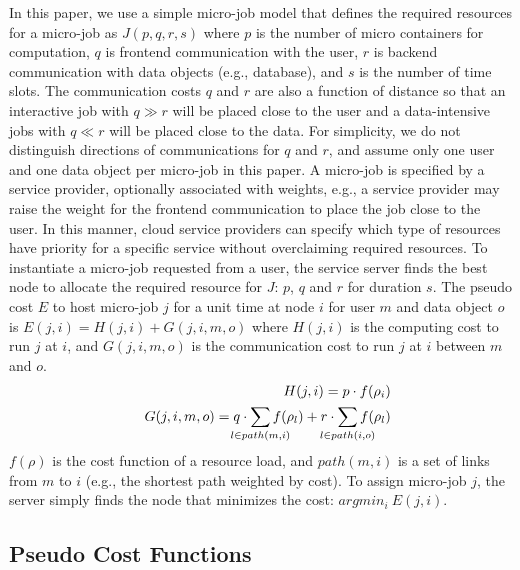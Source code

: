 In this paper, we use a simple micro-job model that defines the
required resources for a micro-job as $J(p, q, r, s)$ where
$p$ is the number of micro containers for computation,
$q$ is frontend communication with the user,
$r$ is backend communication with data objects (e.g., database), and
$s$ is the number of time slots.
The communication costs $q$ and $r$ are also a function of distance so
that an interactive job with $q \gg r$ will be placed close to the
user and a data-intensive jobs with $q \ll r$ will be placed close to
the data.
For simplicity, we do not distinguish directions of
communications for $q$ and $r$, and assume only one user and one data
object per micro-job in this paper.
A micro-job is specified by a service provider, optionally associated with
weights, e.g., a service provider may raise the weight for the
frontend communication to place the job close to the user.
In this manner, cloud service providers can specify which
type of resources have priority for a specific service without
overclaiming required resources.
To instantiate a micro-job requested from a user, the service
server finds the best node to allocate the required resource
for $J$: $p$, $q$ and $r$ for duration $s$.
The pseudo cost $E$ to host micro-job $j$ for a unit time at node $i$ for
user $m$ and data object $o$ is \(E(j, i)     = H(j,i) + G(j,i,m,o)\) where $H(j, i)$ is the computing cost to run $j$ at $i$, and
$G(j, i, m, o)$ is the communication cost to run $j$ at $i$
between $m$ and $o$.
\begin{eqnarray*}
  &&  H(j,i)      = p \cdot f(\rho_{i}) \\
  &&  G(j,i,m,o)  = q \cdot \smashoperator{\sum_{l \in path(m,i)}} f(\rho_{l}) + r \cdot \smashoperator{\sum_{l \in path(i,o)}} f(\rho_{l})
\end{eqnarray*}
$f(\rho)$ is the cost function of a resource load, and $path(m,i)$ is a set
of links from $m$ to $i$ (e.g., the shortest path weighted by cost).
To assign micro-job $j$, the server simply finds the node that minimizes the
cost: \(argmin_{i} \: E(j, i)\).

\subsection{Pseudo Cost Functions}


